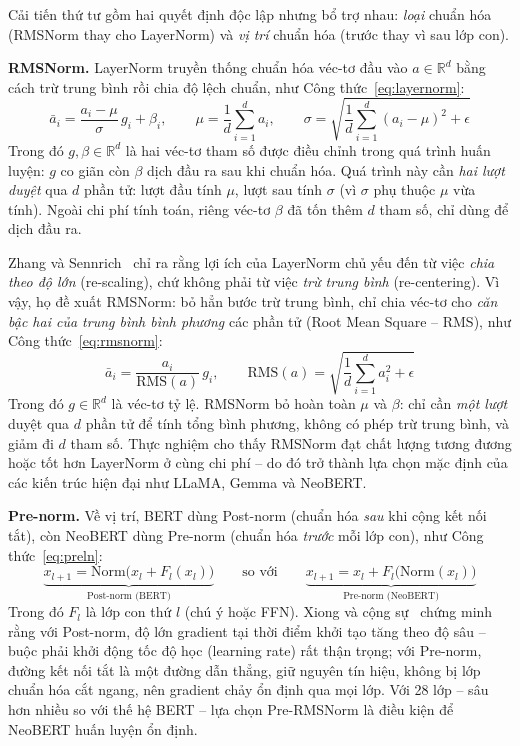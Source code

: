 Cải tiến thứ tư gồm hai quyết định độc lập nhưng bổ trợ nhau: \textit{loại} chuẩn hóa
(RMSNorm thay cho LayerNorm) và \textit{vị trí} chuẩn hóa (trước thay vì sau lớp con).

\textbf{RMSNorm.} LayerNorm truyền thống chuẩn hóa véc-tơ đầu vào $a \in \mathbb{R}^d$
bằng cách trừ trung bình rồi chia độ lệch chuẩn, như Công thức~\eqref{eq:layernorm}:
\begin{equation}
  \label{eq:layernorm}
  \bar{a}_i = \frac{a_i - \mu}{\sigma}\, g_i + \beta_i, \qquad
  \mu = \frac{1}{d}\sum_{i=1}^{d} a_i, \qquad
  \sigma = \sqrt{\frac{1}{d}\sum_{i=1}^{d}(a_i - \mu)^2 + \epsilon}
\end{equation}
Trong đó $g, \beta \in \mathbb{R}^d$ là hai véc-tơ tham số được điều chỉnh trong quá trình
huấn luyện: $g$ co giãn còn $\beta$ dịch đầu ra sau khi chuẩn hóa.
Quá trình này cần \textit{hai lượt duyệt} qua $d$ phần tử: lượt đầu tính $\mu$, lượt sau
tính $\sigma$ (vì $\sigma$ phụ thuộc $\mu$ vừa tính). Ngoài chi phí tính toán, riêng véc-tơ
$\beta$ đã tốn thêm $d$ tham số, chỉ dùng để dịch đầu ra.

Zhang và Sennrich~\cite{zhang2019rmsnorm} chỉ ra rằng lợi ích của LayerNorm chủ yếu đến từ
việc \textit{chia theo độ lớn} (re-scaling), chứ không phải từ việc \textit{trừ trung bình}
(re-centering). Vì vậy, họ đề xuất RMSNorm: bỏ hẳn bước trừ trung bình, chỉ chia véc-tơ cho
\textit{căn bậc hai của trung bình bình phương} các phần tử (Root Mean Square -- RMS), như
Công thức~\eqref{eq:rmsnorm}:
\begin{equation}
  \label{eq:rmsnorm}
  \bar{a}_i = \frac{a_i}{\mathrm{RMS}(a)}\, g_i, \qquad
  \mathrm{RMS}(a) = \sqrt{\frac{1}{d}\sum_{i=1}^{d} a_i^2 + \epsilon}
\end{equation}
Trong đó $g \in \mathbb{R}^d$ là véc-tơ tỷ lệ. RMSNorm bỏ hoàn toàn
$\mu$ và $\beta$: chỉ cần \textit{một lượt} duyệt qua $d$ phần tử để tính tổng bình
phương, không có phép trừ trung bình, và giảm đi $d$ tham số. Thực nghiệm cho thấy
RMSNorm đạt chất lượng tương đương hoặc tốt hơn LayerNorm ở cùng chi phí -- do đó trở
thành lựa chọn mặc định của các kiến trúc hiện đại như LLaMA, Gemma và NeoBERT.

\textbf{Pre-norm.} Về vị trí, BERT dùng Post-norm (chuẩn hóa \textit{sau} khi cộng kết nối
tắt), còn NeoBERT dùng Pre-norm (chuẩn hóa \textit{trước} mỗi lớp con), như
Công thức~\eqref{eq:preln}:
\begin{equation}
  \label{eq:preln}
  \underbrace{x_{l+1} = \mathrm{Norm}\big(x_l + F_l(x_l)\big)}_{\text{Post-norm (BERT)}}
  \qquad\text{so với}\qquad
  \underbrace{x_{l+1} = x_l + F_l\big(\mathrm{Norm}(x_l)\big)}_{\text{Pre-norm (NeoBERT)}}
\end{equation}
Trong đó $F_l$ là lớp con thứ $l$ (chú ý hoặc FFN). Xiong và cộng
sự~\cite{xiong2020layer} chứng minh rằng với Post-norm, độ lớn gradient tại thời điểm khởi
tạo tăng theo độ sâu -- buộc phải khởi động tốc độ học (learning rate) rất thận trọng; với Pre-norm,
đường kết nối tắt là một đường dẫn thẳng, giữ nguyên tín hiệu, không bị lớp chuẩn hóa cắt ngang, nên gradient
chảy ổn định qua mọi lớp. Với 28 lớp -- sâu hơn nhiều so với thế hệ BERT -- lựa chọn Pre-RMSNorm là
điều kiện để NeoBERT huấn luyện ổn định.

